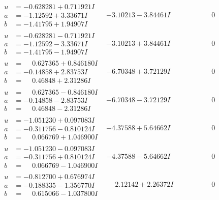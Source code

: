 \documentclass[1p]{elsarticle_modified}
\theoremstyle{definition}
\begin{document}
$$\begin{array}{c|c|c}
\begin{aligned}
u &= -0.628281 + 0.711921 I \\
a &= -1.12592 + 3.33671 I \\
b &= -1.41795 + 1.94907 I\end{aligned}
 & -3.10213 - 3.84461 I & \phantom{-0.000000 } 0 \\ \hline\begin{aligned}
u &= -0.628281 - 0.711921 I \\
a &= -1.12592 - 3.33671 I \\
b &= -1.41795 - 1.94907 I\end{aligned}
 & -3.10213 + 3.84461 I & \phantom{-0.000000 } 0 \\ \hline\begin{aligned}
u &= \phantom{-}0.627365 + 0.846180 I \\
a &= -0.14858 + 2.83753 I \\
b &= \phantom{-}0.46848 + 2.31286 I\end{aligned}
 & -6.70348 + 3.72129 I & \phantom{-0.000000 } 0 \\ \hline\begin{aligned}
u &= \phantom{-}0.627365 - 0.846180 I \\
a &= -0.14858 - 2.83753 I \\
b &= \phantom{-}0.46848 - 2.31286 I\end{aligned}
 & -6.70348 - 3.72129 I & \phantom{-0.000000 } 0 \\ \hline\begin{aligned}
u &= -1.051230 + 0.097083 I \\
a &= -0.311756 - 0.810124 I \\
b &= \phantom{-}0.066769 + 1.046900 I\end{aligned}
 & -4.37588 + 5.64662 I & \phantom{-0.000000 } 0 \\ \hline\begin{aligned}
u &= -1.051230 - 0.097083 I \\
a &= -0.311756 + 0.810124 I \\
b &= \phantom{-}0.066769 - 1.046900 I\end{aligned}
 & -4.37588 - 5.64662 I & \phantom{-0.000000 } 0 \\ \hline\begin{aligned}
u &= -0.812700 + 0.676974 I \\
a &= -0.188335 - 1.356770 I \\
b &= \phantom{-}0.615066 - 1.037800 I\end{aligned}
 & \phantom{-}2.12142 + 2.26372 I & \phantom{-0.000000 } 0 \\ \hline\begin{aligned}

\end{aligned}
\end{array}$$
\end{document}
